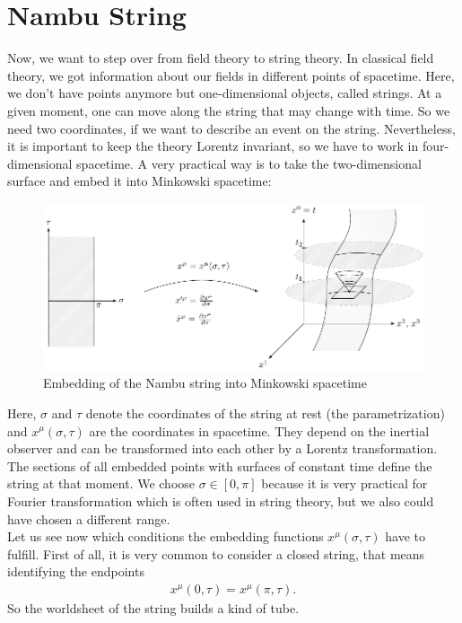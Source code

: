 \chapter{Nambu String}

Now, we want to step over from field theory to string theory. In classical field theory, we got information about our fields in different points of spacetime. Here, we don't have points anymore but one-dimensional objects, called strings. At a given moment, one can move along the string that may change with time. So we need two coordinates, if we want to describe an event on the string. Nevertheless, it is important to keep the theory Lorentz invariant, so we have to work in four-dimensional spacetime. A very practical way is to take the two-dimensional surface and embed it into Minkowski spacetime:
\begin{figure}[H]
\includegraphics[width=\textwidth]{img/string.pdf}
\caption{Embedding of the Nambu string into Minkowski spacetime}
\label{fig:8}
\end{figure}
Here, $\sigma$ and $\tau$ denote the coordinates of the string at rest (the parametrization) and $x^{\mu}(\sigma, \tau)$ are the coordinates in spacetime. They depend on the inertial observer and can be transformed into each other by a Lorentz transformation. The sections of all embedded points with surfaces of constant time define the string at that moment. We choose $\sigma \in [0,\pi]$ because it is very practical for Fourier transformation which is often used in string theory, but we also could have chosen a different range. \\

Let us see now which conditions the embedding functions $x^{\mu}(\sigma, \tau)$ have to fulfill. First of all, it is very common to consider a closed string, that means identifying the endpoints 
\begin{align}
x^{\mu}(0, \tau) = x^{\mu}(\pi, \tau).
\end{align}
So the worldsheet of the string builds a kind of tube. \\

